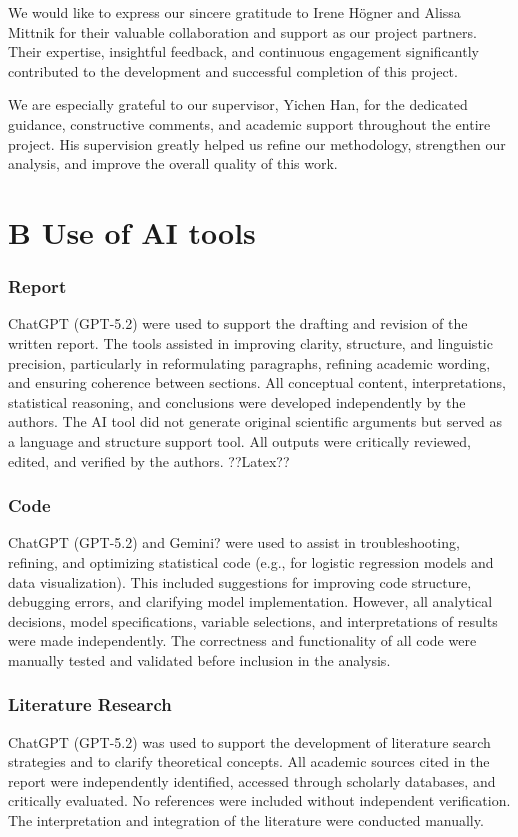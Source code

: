 \documentclass[
]{ajs}
\begin{document}
We would like to express our sincere gratitude to Irene Högner and
Alissa Mittnik for their valuable collaboration and support as our
project partners. Their expertise, insightful feedback, and continuous
engagement significantly contributed to the development and successful
completion of this project.

We are especially grateful to our supervisor, Yichen Han, for the
dedicated guidance, constructive comments, and academic support
throughout the entire project. His supervision greatly helped us refine
our methodology, strengthen our analysis, and improve the overall
quality of this work.

\section{B Use of AI tools}\label{b-use-of-ai-tools}

\subsubsection{Report}\label{report}

ChatGPT (GPT-5.2) were used to support the drafting and revision of the
written report. The tools assisted in improving clarity, structure, and
linguistic precision, particularly in reformulating paragraphs, refining
academic wording, and ensuring coherence between sections. All
conceptual content, interpretations, statistical reasoning, and
conclusions were developed independently by the authors. The AI tool did
not generate original scientific arguments but served as a language and
structure support tool. All outputs were critically reviewed, edited,
and verified by the authors. ??Latex??

\subsubsection{Code}\label{code}

ChatGPT (GPT-5.2) and Gemini? were used to assist in troubleshooting,
refining, and optimizing statistical code (e.g., for logistic regression
models and data visualization). This included suggestions for improving
code structure, debugging errors, and clarifying model implementation.
However, all analytical decisions, model specifications, variable
selections, and interpretations of results were made independently. The
correctness and functionality of all code were manually tested and
validated before inclusion in the analysis.

\subsubsection{Literature Research}\label{literature-research}

ChatGPT (GPT-5.2) was used to support the development of literature
search strategies and to clarify theoretical concepts. All academic
sources cited in the report were independently identified, accessed
through scholarly databases, and critically evaluated. No references
were included without independent verification. The interpretation and
integration of the literature were conducted manually.
\end{document}

